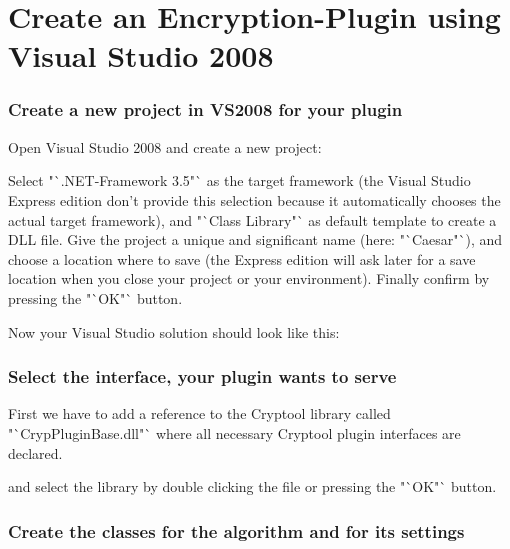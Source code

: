 \part{Create an Encryption-Plugin using Visual Studio 2008}

\section{Create a new project in VS2008 for your plugin}\label{sec:CreateANewProjectInVS2008ForYourPlugin}
Open Visual Studio 2008 and create a new project:



Select "`.NET-Framework 3.5"` as the target framework (the Visual Studio Express edition don't provide this selection because it automatically chooses the actual target framework), and "`Class Library"` as default template to create a DLL file. Give the project a unique and significant name (here: "`Caesar"`), and choose a location where to save (the Express edition will ask later for a save location when you close your project or your environment).  Finally confirm by pressing the "`OK"` button.




Now your Visual Studio solution should look like this:





\section{Select the interface, your plugin wants to serve}\label{sec:SelectTheInterfaceYourPluginWantsToServe}
First we have to add a reference to the Cryptool library called "`CrypPluginBase.dll"` where all necessary Cryptool plugin interfaces are declared.

and select the library by double clicking the file or pressing the "`OK"` button.
 

\section{Create the classes for the algorithm and for its settings}\label{sec:CreateTheClassesForTheAlgorithmAndForItsSettings}
